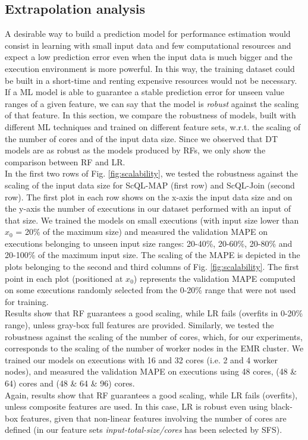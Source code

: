 \documentclass[a4paper, 10pt, conference]{ieeeconf}      %
\begin{document}
\subsection{Extrapolation analysis}
\label{subsec:extrapolation}


A desirable way to build a prediction model for performance estimation would consist in learning with small input data and few computational resources and expect a low prediction error even when the input data is much bigger and the execution environment is more powerful. In this way, the training dataset could be built in a short-time and renting expensive resources would not be necessary.
If a ML model is able to guarantee a stable prediction error for unseen value ranges of a given feature, we can say that the model is \textit{robust} against the scaling of that feature.
In this section, we compare the robustness of models, built with different  ML techniques and trained on different feature sets, w.r.t. the scaling of the number of cores and of the input data size. Since we observed that DT models are as robust as the models produced by RFs, we only show the comparison between RF and LR.\\
In the first two rows of Fig. \ref{fig:scalability}, we tested the robustness against the scaling of the input data size for ScQL-MAP (first row) and ScQL-Join (second row). The first plot in each row shows on the x-axis the input data size and on the y-axis the number of executions in our dataset performed with an input of that size.
We trained the models on small executions (with input size lower than $x_0$ = 20\% of the maximum size) and measured the validation MAPE on executions belonging to unseen input size ranges: 20-40\%, 20-60\%, 20-80\% and 20-100\% of the maximum input size.
The scaling of the MAPE is depicted in the plots belonging to the second and third columns of Fig. \ref{fig:scalability}. The first point in each plot (positioned at $x_0$) represents the validation MAPE computed on some executions randomly selected  from the 0-20\% range that were not used for training. \\
Results show that RF guarantees a good scaling, while LR fails (overfits in 0-20\% range), unless gray-box full features are provided. Similarly, we tested the robustness against the scaling of the number of cores, which, for our experiments, corresponds to the scaling of the number of worker nodes in the EMR cluster. We trained our models on executions with 16 and 32 cores (i.e. 2 and 4 worker nodes), and measured the validation MAPE on executions using 48 cores, (48 \& 64) cores and (48 \& 64 \& 96) cores.\\
Again, results show that RF guarantees a good scaling, while LR fails (overfits), unless composite features are used. In this case, LR  is robust even using black-box features, given that non-linear features involving the number of cores are defined (in our feature sets  \textit{input-total-size/cores} has been selected by SFS).
\end{document}
